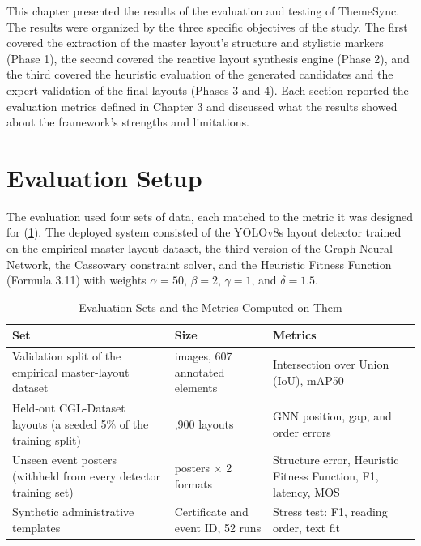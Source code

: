 \begin{refsection}

This chapter presented the results of the evaluation and testing of ThemeSync. The results were organized by the three specific objectives of the study. The first covered the extraction of the master layout's structure and stylistic markers (Phase 1), the second covered the reactive layout synthesis engine (Phase 2), and the third covered the heuristic evaluation of the generated candidates and the expert validation of the final layouts (Phases 3 and 4). Each section reported the evaluation metrics defined in Chapter 3 and discussed what the results showed about the framework's strengths and limitations.

\section{Evaluation Setup}

The evaluation used four sets of data, each matched to the metric it was designed for (\ref{tab:eval-sets}). The deployed system consisted of the YOLOv8s layout detector trained on the empirical master-layout dataset, the third version of the Graph Neural Network, the Cassowary constraint solver, and the Heuristic Fitness Function (Formula 3.11) with weights $\alpha = 50$, $\beta = 2$, $\gamma = 1$, and $\delta = 1.5$.

\begin{table}[ht]
\centering
\caption{Evaluation Sets and the Metrics Computed on Them}
\label{tab:eval-sets}
\small
\begin{tabular}{>{\raggedright\arraybackslash}p{} >{\raggedright\arraybackslash}p{} >{\raggedright\arraybackslash}p{}}
\hline
\textbf{Set} & \textbf{Size} & \textbf{Metrics} \\ \hline
Validation split of the empirical master-layout dataset & 40 images, 607 annotated elements & Intersection over Union (IoU), mAP50 \\
Held-out CGL-Dataset layouts (a seeded 5\% of the training split) & 2,900 layouts & GNN position, gap, and order errors \\
Unseen event posters (withheld from every detector training set) & 16 posters $\times$ 2 formats & Structure error, Heuristic Fitness Function, F1, latency, MOS \\
Synthetic administrative templates & Certificate and event ID, 52 runs & Stress test: F1, reading order, text fit \\ \hline
\end{tabular}
\end{table}


\end{refsection}
